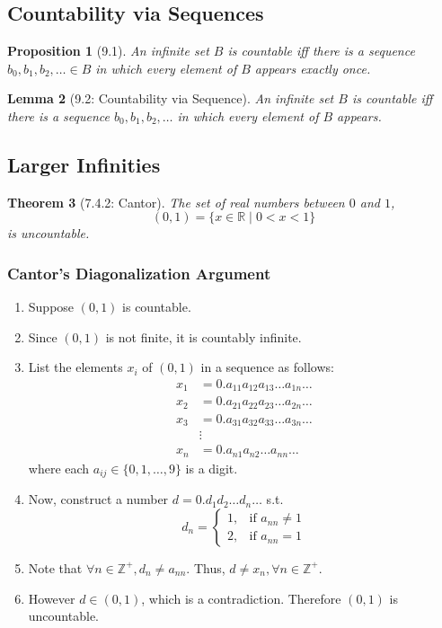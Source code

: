 \documentclass{article}
\theoremstyle{plain}
\newtheorem{theorem}{Theorem}[section]
\newtheorem{lemma}[theorem]{Lemma}
\newtheorem{proposition}[theorem]{Proposition}
\theoremstyle{definition}
\theoremstyle{remark}
\begin{document}
\subsection{Countability via Sequences}

\begin{proposition}[9.1]
    An infinite set $B$ is countable iff there is a sequence $b_0, b_1, b_2, \dots \in B$ in which every element of $B$ appears exactly once.
\end{proposition}

\begin{lemma}[9.2: Countability via Sequence]
    An infinite set $B$ is countable iff there is a sequence $b_0, b_1, b_2, \dots$ in which every element of $B$ appears.
\end{lemma}

\subsection{Larger Infinities}

\begin{theorem}[7.4.2: Cantor]
    The set of real numbers between $0$ and $1$,
    \[ (0,1) = \{x \in \mathbb{R} \mid 0 < x < 1\} \]
    is uncountable.
\end{theorem}

\subsubsection*{Cantor's Diagonalization Argument}
\begin{enumerate}
    \item Suppose $(0,1)$ is countable.
    \item Since $(0,1)$ is not finite, it is countably infinite.
    \item List the elements $x_i$ of $(0,1)$ in a sequence as follows:
    \[
        \begin{aligned}
            x_1 &= 0.a_{11}a_{12}a_{13}\dots a_{1n}\dots \\
            x_2 &= 0.a_{21}a_{22}a_{23}\dots a_{2n}\dots \\
            x_3 &= 0.a_{31}a_{32}a_{33}\dots a_{3n}\dots \\
            &\vdots \\
            x_n &= 0.a_{n1}a_{n2}\dots a_{nn}\dots
        \end{aligned}
    \]
    where each $a_{ij} \in \{0, 1, \dots, 9\}$ is a digit.
    \item Now, construct a number $d = 0.d_1 d_2 \dots d_n \dots$ s.t.
    \[
        d_n =
        \begin{cases}
            1, & \text{if } a_{nn} \neq 1 \\
            2, & \text{if } a_{nn} = 1
        \end{cases}
    \]
    \item Note that $\forall n \in \mathbb{Z}^+, d_n \neq a_{nn}$. Thus, $d \neq x_n, \forall n \in \mathbb{Z}^+$.
    \item However $d \in (0,1)$, which is a contradiction. Therefore $(0,1)$ is uncountable.
\end{enumerate}
\end{document}
